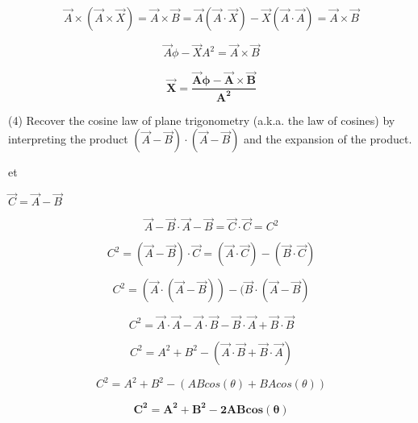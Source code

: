\documentclass[12pt]{article}
\begin{document}
$$
\vec{A} \times (\vec{A} \times \vec{X}) = \vec{A} \times \vec{B} = \vec{A}(\vec{A} \cdot \vec{X}) - \vec{X}(\vec{A} \cdot \vec{A}) = \vec{A} \times \vec{B}
$$

$$
\vec{A} \phi - \vec{X} A^2 = \vec{A} \times \vec{B}
$$

$$
\boldsymbol{\vec{X} = \frac{\vec{A} \phi - \vec{A} \times \vec{B}}{A^2}}
$$


\newpage


(4) Recover the cosine law of plane trigonometry (a.k.a. the law of cosines) by interpreting the product $(\vec{A} - \vec{B}) \cdot (\vec{A} - \vec{B})$ and the expansion of the product.

\hfill \break

\ell et 

$\vec{C} = \vec{A} - \vec{B}$

$$
\vec{A} - \vec{B} \cdot \vec{A} - \vec{B} = \vec{C} \cdot \vec{C} = C^2
$$

$$
C^2 = (\vec{A} - \vec{B}) \cdot \vec{C} = (\vec{A} \cdot \vec{C}) - (\vec{B} \cdot \vec{C})
$$

$$
C^2 = (\vec{A} \cdot (\vec{A} - \vec{B})) - (\vec{B} \cdot (\vec{A} - \vec{B})
$$

$$
C^2 = \vec{A} \cdot \vec{A} - \vec{A} \cdot \vec{B} - \vec{B} \cdot \vec{A} + \vec{B} \cdot \vec{B}
$$

$$
C^2 = A^2 + B^2 - (\vec{A} \cdot \vec{B} + \vec{B} \cdot \vec{A})
$$

$$
C^2 = A^2 + B^2 - (ABcos(\theta) + BAcos(\theta))
$$

$$
\boldsymbol{C^2 = A^2 + B^2 - 2ABcos(\theta)}
$$
\end{document}
